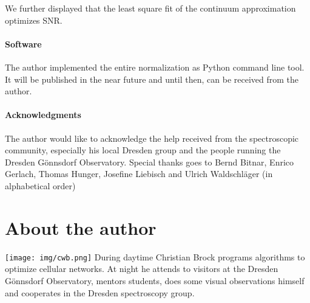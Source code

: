 \documentclass[10pt,a4paper,notitlepage,twocolumn]{article}
\begin{document}
We further displayed that the least square fit of the continuum approximation optimizes SNR.

\paragraph{Software}
The author implemented the entire normalization as Python command line tool.
It will be published in the near future and until then, can be received from the author.

\paragraph{Acknowledgments}
The author would like to acknowledge the help received from the spectroscopic community, especially his local Dresden group and the people running the Dresden Gönnsdorf Observatory. Special thanks goes to Bernd Bitnar, Enrico Gerlach, Thomas Hunger, Josefine Liebisch and Ulrich Waldschläger (in alphabetical order)




\section*{About the author}
\texttt{[image: img/cwb.png]}
During daytime Christian Brock programs algorithms to optimize cellular networks.
At night he attends to visitors at the Dresden Gönnsdorf Observatory, mentors students, does some visual observations himself and cooperates in the Dresden spectroscopy group.
\end{document}
